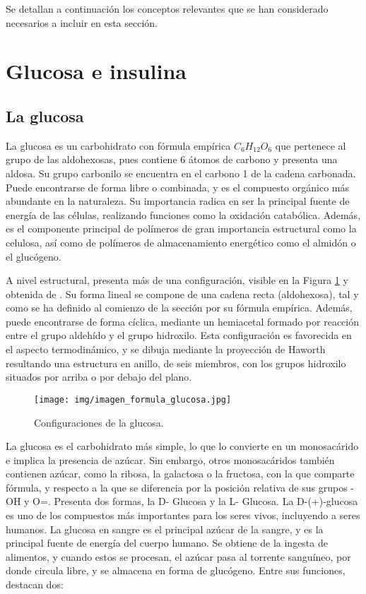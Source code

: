 

Se detallan a continuación los conceptos relevantes que se han considerado necesarios a incluir en esta sección.

\section{Glucosa e insulina}

\subsection{La glucosa}

La glucosa es un carbohidrato con fórmula empírica $ C_6H_{12}O_6$ que pertenece al grupo de las aldohexosas, pues contiene 6 átomos de carbono y presenta una aldosa.  Su grupo carbonilo se encuentra en el carbono 1 de la cadena carbonada.
Puede encontrarse de forma libre o combinada, y es el compuesto orgánico más abundante en la naturaleza. Su importancia radica en ser la principal fuente de energía de las células, realizando funciones como la oxidación catabólica. Además, es el componente principal de polímeros de gran importancia estructural como la celulosa, así como de polímeros de almacenamiento energético como el almidón o el glucógeno.


A nivel estructural, presenta más de una configuración, visible en la Figura \ref{fig:formula_glucosa} y obtenida de \cite{murray2007bioquimica}. Su forma lineal se compone de una cadena recta (aldohexosa), tal y como se ha definido al comienzo de la sección por su fórmula empírica. Además, puede encontrarse de forma cíclica, mediante un hemiacetal formado por reacción entre el grupo aldehído y el grupo hidroxilo. Esta configuración es favorecida en el aspecto termodinámico, y se dibuja mediante la proyección de Haworth resultando una estructura en anillo, de seis miembros, con los grupos hidroxilo situados por arriba o por debajo del plano.

\begin{figure}[h]
    \centering
    \texttt{[image: img/imagen\_formula\_glucosa.jpg]}
    \caption{Configuraciones de la glucosa.}
    \label{fig:formula_glucosa}
    \vspace{0.5cm} %
\end{figure}

La glucosa es el carbohidrato más simple, lo que lo convierte en un monosacárido e implica la presencia de azúcar. Sin embargo, otros monosacáridos también contienen azúcar, como la ribosa, la galactosa o la fructosa, con la que comparte fórmula, y respecto a la que se diferencia por la posición relativa de sus grupos -OH y O=.  
Presenta dos formas, la D- Glucosa y la L- Glucosa. La D-(+)-glucosa es uno de los compuestos más importantes para los seres vivos, incluyendo a seres humanos.
La glucosa en sangre es el principal azúcar de la sangre, y es la principal fuente de energía del cuerpo humano. Se obtiene de la ingesta de alimentos, y cuando estos se procesan, el azúcar pasa al torrente sanguíneo, por donde circula libre, y se almacena en forma de glucógeno. Entre sus funciones, destacan dos:


